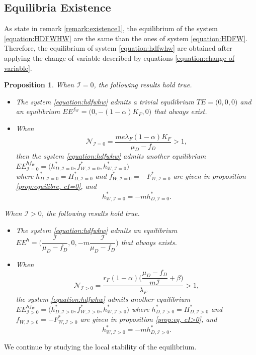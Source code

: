 \documentclass{article}
\newcommand{\lfw}{\lambda_{F}}
\newcommand{\lfw}{\lambda_{F}}
\newcommand{\cI}{\mathcal{I}}
\newtheorem{prop}[theorem]{Proposition}
\theoremstyle{definition}
\theoremstyle{remark}
\begin{document}
\subsection{Equilibria Existence}
As state in remark \ref{remark:existence1}, the equilibrium of the system \eqref{equation:HDFWHW} are the same than the ones of system \eqref{equation:HDFW}. Therefore, the equilibrium of system \eqref{equation:hdfwhw} are obtained after applying the change of variable described by equations \eqref{equation:change of variable}.

\begin{prop}
When $\cI = 0$, the following results hold true.
\begin{itemize}
\item The system \eqref{equation:hdfwhw} admits a trivial equilibrium $TE = \Big(0,0, 0\Big)$ and an equilibrium $EE^{f_W} = \Big(0, -(1-\alpha)K_F,0 \Big)$ that always exist.

\item When
$$
\mathcal{N}_{\cI = 0} = \dfrac{m e \lfw (1-\alpha)K_F}{\mu_D - f_D} > 1,
$$ 
then the system \eqref{equation:hdfwhw} admits another equilibrium $EE^{hf_W}_{\cI = 0} = \Big(h^*_{D, \cI = 0}, f^*_{W, \cI = 0}, h^*_{W, \cI = 0}\Big)$ \\ 
where $h^*_{D, \cI = 0} = H^*_{D, \cI = 0}$ and $f^*_{W, \cI = 0} = -F^*_{W, \cI = 0}$ are given in proposition \ref{prop:equilibre, cI=0}, and
$$ 
h^*_{W, \cI = 0} = -m h^*_{D, \cI = 0}.
$$
\end{itemize}

When $\cI > 0$, the following results hold true.
\begin{itemize}
\item The system \eqref{equation:hdfwhw} admits an equilibrium $EE^{h} = \Big(\dfrac{\cI}{\mu_D - f_D}, 0, -m\dfrac{\cI}{\mu_D - f_D} \Big)$ that always exists.
\item When 
$$ \mathcal{N}_{\cI >0} =\dfrac{r_F(1-\alpha)\Big({\dfrac{\mu_D - f_D}{m\cI}+\beta\Big)}}{\lfw}  > 1,$$
the system \eqref{equation:hdfwhw} admits another equilibrium $EE^{hf_W}_{\cI > 0} = \Big(h^*_{D, \cI > 0}, f^*_{W, \cI > 0}, h^*_{W, \cI > 0}\Big)$
where $h^*_{D, \cI > 0} = H^*_{D, \cI > 0}$ and $f_{W, \cI > 0} = - F^*_{W, \cI > 0}$ are given in proposition \ref{prop:eq, cI>0}, and
$$ 
h^*_{W, \cI > 0} = -m h^*_{D, \cI > 0}.
$$
\end{itemize} 
\end{prop}  

We continue by studying the local stability of the equilibrium.
\end{document}
